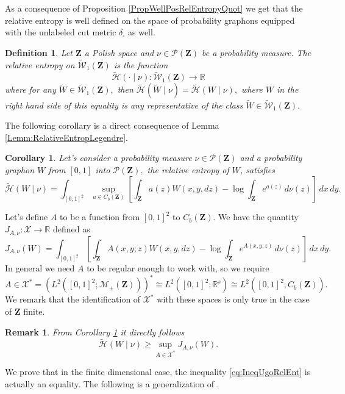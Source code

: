 \documentclass[12pt,twoside,a4paper]{article}
\newtheorem{corollary}{Corollary}[theorem]
\newtheorem{definition}[theorem]{Definition}
\newtheorem{remark}[theorem]{Remark}
\newcommand{\cP}{{\mathcal P}}  %
\newcommand{\Space}{\mathbf{Z}}
\newcommand{\UGraphon}{\widetilde{\mathcal{W}}_1}
\newcommand{\Ugo}{\mathcal{X}^*}
\begin{document}
As a consequence of Proposition \ref{PropWellPosRelEntropyQuot} we get that the relative entropy is well defined on the space of probability graphons equipped with the unlabeled cut metric $\delta_{\square}$ as well. 

\begin{definition}\label{DefRelativeEntropyProbGraphonsRelabe}
Let $\Space$ a Polish space and $\nu \in \cP(\Space)$ be a probability measure.
The relative entropy on $\UGraphon(\Space)$ is the function
\begin{equation*}
    \widetilde{\mathcal{H}}(\cdot \mid \nu):\UGraphon(\Space) \to \mathbb{R} 
\end{equation*}
where for any $\widetilde{W}\in \UGraphon(\Space),$ then $\widetilde{\mathcal{H}}(\widetilde{W} \mid \nu)=\widetilde{\mathcal{H}}(W\mid \nu),$ where $W$ in the right hand side of this equality is any representative of the class $\widetilde{W}\in \UGraphon(\Space).$ 
\end{definition}

The following corollary is a direct consequence of Lemma \ref{Lemm:RelativeEntropLegendre}.

\begin{corollary}\label{CorProbGraphonRelENTROPLegendre}
Let's consider a probability measure $\nu\in \mathcal{P}(\Space)$ and a probability graphon $W$ from $[0,1]$ into $\mathcal{P}(\Space),$ the relative entropy of $W$, satisfies \[
\widetilde{\mathcal{H}}(W \mid \nu) = \int_{[0,1]^2} \sup_{a \in C_b(\Space)} \left[ \int_\Space a(z) W(x,y,dz) - \log \int_\Space e^{a(z)} \, d\nu(z) \right] \, dx \, dy.
\]
\end{corollary}
Let's define $A$ to be a function from $[0,1]^2$ to $C_b(\Space)$. We have the quantity $J_{A,\nu}: \mathcal{X}\to \mathbb{R}$ defined as 
\[
J_{A,\nu}(W)=\int_{[0,1]^2}  \left[ \int_\Space A(x,y;z) W(x,y,dz) - \log \int_\Space e^{A(x,y;z)} \, d\nu(z) \right]\, dx \, dy.
\]
In general we need $A$ to be regular enough to work with, so we require 
\[
A\in\mathcal{X}^*=(L^2([0,1]^2;\mathcal{M}_{\pm}(\Space)))^*\cong L^2([0,1]^2;\mathbb{R}^s) \cong L^2([0,1]^2;C_b(\Space)).
\] 
We remark that the identification of $\mathcal{X}^*$ with these spaces is only true in the case of $\Space$ finite.
\begin{remark}\label{RemkRelEntropIneqJ}
From Corollary \ref{CorProbGraphonRelENTROPLegendre} it directly follows 
\begin{equation}\label{eq:IneqUgoRelEnt}
    \widetilde{\mathcal{H}}(W \mid \nu) \geq \sup_{A \in  \Ugo}J_{A,\nu}(W).
\end{equation}
\end{remark}
We prove that in the finite dimensional case, the inequality \eqref{eq:IneqUgoRelEnt} is actually an equality. The following is a generalization of \cite[Lemma 5.2]{chatterjee2017large}.
\end{document}
